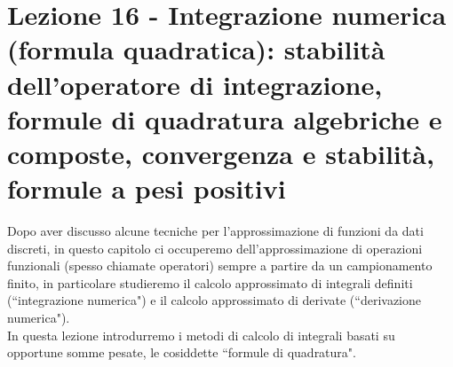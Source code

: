 \documentclass[12pt,a4paper]{article}
\begin{document}
\section[Lezione 16 - Integrazione numerica, formule di quadratura]{Lezione 16 - Integrazione numerica (formula quadratica): stabilità dell'operatore di integrazione, formule di quadratura algebriche e composte, convergenza e stabilità, formule a pesi positivi}
Dopo aver discusso alcune tecniche per l'approssimazione di funzioni da dati discreti, in questo capitolo ci occuperemo dell'approssimazione di operazioni funzionali (spesso chiamate operatori) sempre a partire da un campionamento finito, in particolare studieremo il calcolo approssimato di integrali definiti (``integrazione numerica") e il calcolo approssimato di derivate (``derivazione numerica").\\
In questa lezione introdurremo i metodi di calcolo di integrali basati su opportune somme pesate, le cosiddette ``formule di quadratura".
\end{document}
